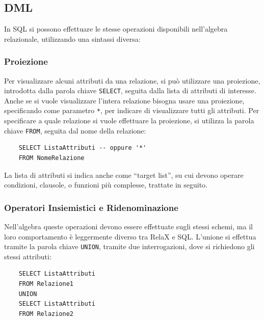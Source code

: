 \documentclass{article}
\numberwithin{equation}{subsection}
\begin{document}
\subsection{DML}

In SQL si possono effettuare le stesse operazioni disponibili nell'algebra relazionale, utilizzando una sintassi diversa:

\subsubsection{Proiezione}

Per visualizzare alcuni attributi da una relazione, si può utilizzare una proiezione, introdotta dalla parola chiave \verb|SELECT|, seguita dalla lista di attributi di interesse. Anche se si vuole visualizzare l'intera 
relazione bisogna usare una proiezione, specificando come parametro \verb|*|, per indicare di visualizzare tutti gli attributi. Per specificare a quale relazione si vuole effettuare la proiezione, si utilizza 
la parola chiave \verb|FROM|, seguita dal nome della relazione:
\begin{verbatim}
    SELECT ListaAttributi -- oppure '*'
    FROM NomeRelazione
\end{verbatim}

La lista di attributi si indica anche come ``target list'', su cui devono operare condizioni, clausole, o funzioni più complesse, trattate in seguito. 

\subsubsection{Operatori Insiemistici e Ridenominazione}

Nell'algebra queste operazioni devono essere effettuate sugli stessi schemi, ma il loro comportamento è leggermente diverso tra RelaX e SQL. L'unione si effettua tramite la parola chiave \verb|UNION|, tramite 
due interrogazioni, dove si richiedono gli stessi attributi:
\begin{verbatim}
    SELECT ListaAttributi
    FROM Relazione1
    UNION
    SELECT ListaAttributi
    FROM Relazione2
\end{verbatim}
\end{document}
